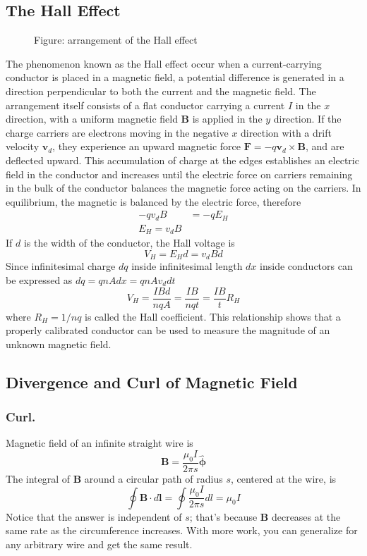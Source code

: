 \documentclass[../../../main.tex]{subfiles}
\begin{document}
\subsection*{The Hall Effect} 
\begin{figure*}[t]
    \centering
    \caption*{Figure: arrangement of the Hall effect}
\end{figure*}
The phenomenon known as the Hall effect occur when a current-carrying conductor is placed in a magnetic field, a potential difference is generated in a direction perpendicular to both the current and the magnetic field. The arrangement itself consists of a flat conductor carrying a current $I$ in the $x$ direction, with a uniform magnetic field \textbf{B} is applied in the $y$ direction. If the charge carriers are electrons moving in the negative $x$ direction with a drift velocity $\mathbf{v}_d$, they experience an upward magnetic force $\mathbf{F}=-q\mathbf{v}_d\times\mathbf{B}$, and are deflected upward. This accumulation of charge at the edges establishes an electric field in the conductor and increases until the electric force on carriers remaining in the bulk of the conductor balances the magnetic force acting on the carriers. In equilibrium, the magnetic is balanced by the electric force, therefore
\begin{align*}
    -qv_dB&=-qE_H\\
    E_H=v_dB
\end{align*}
If $d$ is the width of the conductor, the Hall voltage is
\begin{equation*}
    V_H=E_Hd=v_dBd
\end{equation*}
Since infinitesimal charge $dq$ inside infinitesimal length $dx$ inside conductors can be expressed as $dq=qnAdx=qnAv_ddt$
\begin{equation*}
    V_H=\frac{IBd}{nqA}=\frac{IB}{nqt}=\frac{IB}{t}R_H
\end{equation*}
where $R_H=1/nq$ is called the Hall coefficient. This relationship shows that a properly calibrated conductor can be used to measure the magnitude of an unknown magnetic field. 

\subsection*{Divergence and Curl of Magnetic Field}
\subsubsection*{Curl.} Magnetic field of an inﬁnite straight wire is
\begin{equation*}
    \mathbf{B}=\frac{\mu_0I}{2\pi s}\boldsymbol{\hat{\phi}}
\end{equation*}
The integral of \textbf{B} around a circular path of radius $s$, centered at the wire, is
\begin{equation*}
    \oint \mathbf{B}\cdot d\mathbf{l}=\oint\frac{\mu_0I}{2\pi s}dl=\mu_0I
\end{equation*}
Notice that the answer is independent of $s$; that's because \textbf{B} decreases at the same rate as the circumference increases. With more work, you can generalize for any arbitrary wire and get the same result. 
\end{document}
